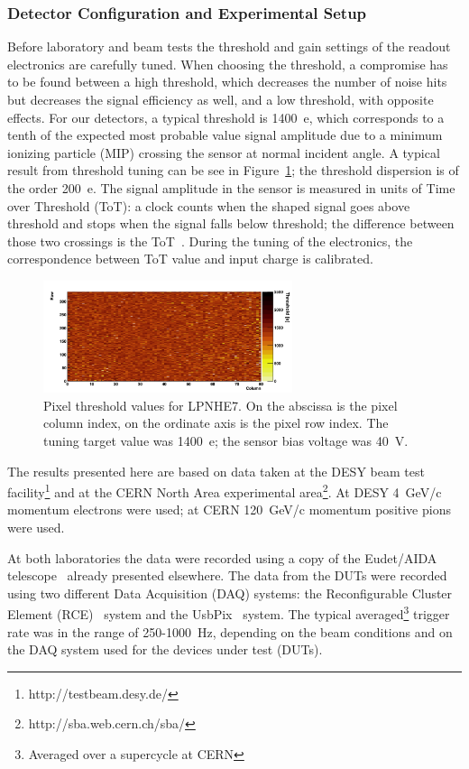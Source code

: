 \subsubsection{Detector Configuration and Experimental Setup}
Before laboratory and beam tests the threshold and gain settings of the readout electronics are carefully tuned. When choosing the threshold, a compromise has to be found between a high threshold, which decreases the number of noise hits but decreases the signal efficiency as well, and a low threshold, with opposite effects. For our detectors, a typical threshold is 1400~e, which corresponds to a tenth of the expected most probable value signal amplitude due to a minimum ionizing particle (MIP) crossing the sensor at normal incident angle. A typical result from  threshold tuning\cite{FEI4,USBpix} can be see in Figure~\ref{fig:threshold}; the threshold dispersion is of the order 200~e. The signal amplitude in the sensor is measured in  units of Time over Threshold (ToT): a clock counts when the shaped signal  goes above threshold and stops when the signal falls below threshold; the difference between those two crossings is the ToT~\cite{FEI4}. During the tuning of the electronics, the correspondence between ToT value and input charge is calibrated.\\
\begin{figure}[!htb]
\centering
\includegraphics[width=0.65\textwidth]{lpnhe7_threshold_40V.png}
\caption{\label{fig:threshold}Pixel threshold values for LPNHE7. On the abscissa is the pixel column index, on the ordinate axis is the pixel row index.
The tuning target value was 1400~e; the sensor bias voltage was 40~V.}
\end{figure}


The results presented here are based on data
taken at the DESY beam test facility\footnote{http://testbeam.desy.de/} and at the CERN
North Area experimental area\footnote{http://sba.web.cern.ch/sba/}.
At DESY 4~GeV/c momentum electrons were used; at CERN 120~GeV/c momentum positive pions were used.


At both laboratories the data were recorded using a copy of the Eudet/AIDA telescope~\cite{Jansen2016} 
already presented elsewhere. 
The data from the DUTs were recorded using two different Data Acquisition (DAQ) systems: the 
Reconfigurable Cluster Element (RCE)~\cite{RCE} system and the UsbPix~\cite{USBpix} system.
The typical averaged\footnote{Averaged over a supercycle at CERN} trigger rate was in the range of 
250-1000~Hz, depending on the
beam conditions and on the DAQ system used for the devices under test (DUTs).



